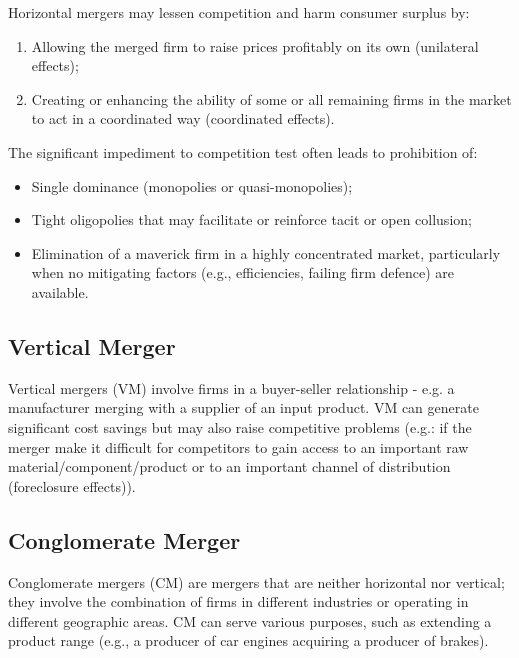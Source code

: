         Horizontal mergers may lessen competition and harm consumer surplus by:
        \begin{enumerate}
            \item Allowing the merged firm to raise prices profitably on its own (unilateral effects);
            \item Creating or enhancing the ability of some or all remaining firms in the market to act in a coordinated way (coordinated effects).
        \end{enumerate}
    
        The significant impediment to competition test often leads to prohibition of:
        \begin{itemize}
            \item Single dominance (monopolies or quasi-monopolies);
            \item Tight oligopolies that may facilitate or reinforce tacit or open collusion;
            \item Elimination of a maverick firm in a highly concentrated market, particularly when no mitigating factors (e.g., efficiencies, failing firm defence) are available.
        \end{itemize}

    \subsection{Vertical Merger}

        Vertical mergers (VM) involve firms in a buyer-seller relationship - e.g. a manufacturer merging with a supplier of an input product. VM can generate significant cost savings but may also raise competitive problems (e.g.: if the merger make it difficult for competitors to gain access to an important raw material/component/product or to an important channel of distribution (foreclosure effects)).

    \subsection{Conglomerate Merger}

        Conglomerate mergers (CM) are mergers that are neither horizontal nor vertical; they involve the combination of firms in different industries or operating in different geographic areas. CM can serve various purposes, such as extending a product range (e.g., a producer of car engines acquiring a producer of brakes).
        
